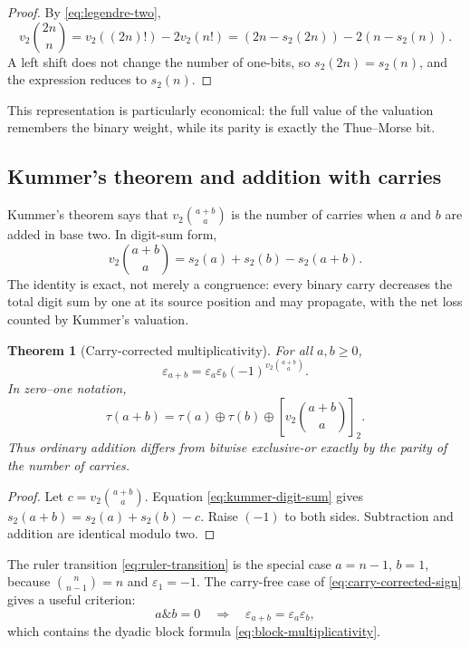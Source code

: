 \documentclass[11pt,oneside]{article}
\newtheorem{theorem}{Theorem}[section]
\theoremstyle{definition}
\theoremstyle{remark}
\newcommand{\vtwo}{v_2}
\newcommand{\bitsum}{s_2}
\newcommand{\eps}{\varepsilon}
\newcommand{\res}[2]{\left[#1\right]_{#2}}
\newcommand{\xor}{\mathbin{\oplus}}
\begin{document}
\begin{proof}
By \eqref{eq:legendre-two},
\[
 \vtwo\!\binom{2n}{n}
   =\vtwo((2n)!)-2\vtwo(n!)
   =(2n-\bitsum(2n))-2(n-\bitsum(n)).
\]
A left shift does not change the number of one-bits, so
\(\bitsum(2n)=\bitsum(n)\), and the expression reduces to \(\bitsum(n)\).
\end{proof}

This representation is particularly economical: the full value of the
valuation remembers the binary weight, while its parity is exactly the
Thue--Morse bit.

\subsection{Kummer's theorem and addition with carries}

Kummer's theorem says that \(\vtwo\binom{a+b}{a}\) is the number of carries
when \(a\) and \(b\) are added in base two.  In digit-sum form,
\begin{equation}
  \vtwo\!\binom{a+b}{a}
   =\bitsum(a)+\bitsum(b)-\bitsum(a+b).
  \label{eq:kummer-digit-sum}
\end{equation}
The identity is exact, not merely a congruence: every binary carry decreases
the total digit sum by one at its source position and may propagate, with the
net loss counted by Kummer's valuation.

\begin{theorem}[Carry-corrected multiplicativity]
For all \(a,b\ge0\),
\begin{equation}
  \boxed{
  \eps_{a+b}=\eps_a\eps_b
    (-1)^{\vtwo\binom{a+b}{a}}.}
  \label{eq:carry-corrected-sign}
\end{equation}
In zero--one notation,
\begin{equation}
  \tau(a+b)=
  \tau(a)\xor\tau(b)\xor
  \res{\vtwo\binom{a+b}{a}}{2}.
  \label{eq:carry-corrected-bit}
\end{equation}
Thus ordinary addition differs from bitwise exclusive-or exactly by the
parity of the number of carries.
\end{theorem}

\begin{proof}
Let \(c=\vtwo\binom{a+b}{a}\).  Equation
\eqref{eq:kummer-digit-sum} gives
\(\bitsum(a+b)=\bitsum(a)+\bitsum(b)-c\).  Raise \((-1)\) to both sides.
Subtraction and addition are identical modulo two.
\end{proof}

The ruler transition \eqref{eq:ruler-transition} is the special case
\(a=n-1\), \(b=1\), because
\(\binom{n}{n-1}=n\) and \(\eps_1=-1\).
The carry-free case of \eqref{eq:carry-corrected-sign} gives a useful
criterion:
\begin{equation}
  a\mathbin{\&}b=0
  \quad\Longrightarrow\quad
  \eps_{a+b}=\eps_a\eps_b,
  \label{eq:carry-free}
\end{equation}
which contains the dyadic block formula
\eqref{eq:block-multiplicativity}.
\end{document}
